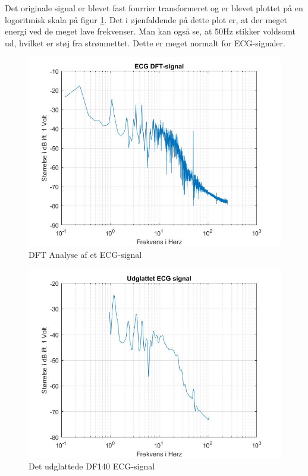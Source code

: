 Det originale signal er blevet fast fourrier transformeret og er blevet plottet på en logoritmisk skala på figur \ref{fig:ECG DFT}. Det i øjenfaldende på dette plot er, at der meget energi ved de meget lave frekvenser. Man kan også se, at 50Hz stikker voldsomt ud, hvilket er støj fra strømnettet. Dette er meget normalt for ECG-signaler.
\begin{figure}[H]
	\centering
	\includegraphics[width=120mm]{figures/ECG/DFT.jpg}
	\caption{DFT Analyse af et ECG-signal}
	\label{fig:ECG DFT}
\end{figure}


\begin{figure}[H]
	\centering
	\includegraphics[width=120mm]{figures/ECG/udglattet.jpg}
	\caption{Det udglattede DF140 ECG-signal}
	\label{fig:ECG udglattet}
\end{figure}

